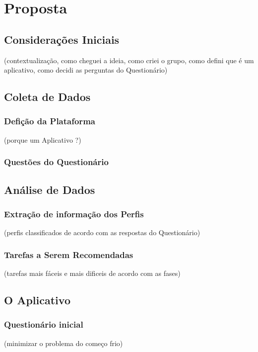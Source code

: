 \chapter[Proposta]{Proposta}

\section{Considerações Iniciais }
(contextualização, como cheguei a ideia, como criei o grupo, como defini que é um aplicativo, como decidi as perguntas do Questionário)

\section{Coleta de Dados}

\subsection{Defição da Plataforma}
(porque um Aplicativo ?)

\subsection{Questões do Questionário}

\section{Análise de Dados}

\subsection{Extração de informação dos Perfis}
(perfis classificados de acordo com as respostas do Questionário)

\subsection{Tarefas a Serem Recomendadas}
(tarefas mais fáceis e mais dificeis de acordo com as fases)

\section{O Aplicativo}

\subsection{Questionário inicial}
(minimizar o problema do começo frio)

